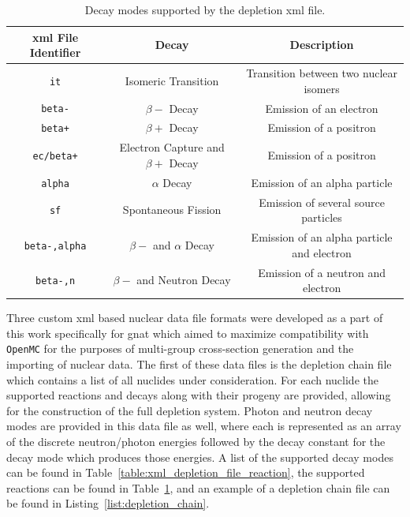 \begin{table}[H]
    \centering
    \caption{Decay modes supported by the depletion \acrshort{xml} file.}
    \begin{tabular}{|c|c|c|}
        \hline
        \acrshort{xml} \textbf{File Identifier} & \textbf{Decay} & \textbf{Description}\\
        \hline
        \texttt{it} & Isomeric Transition & Transition between two nuclear isomers\\
        \texttt{beta-} & $\beta-$ Decay & Emission of an electron\\
        \texttt{beta+} & $\beta+$ Decay & Emission of a positron\\
        \texttt{ec/beta+} & Electron Capture and $\beta+$ Decay & Emission of a positron\\
        \texttt{alpha} & $\alpha$ Decay & Emission of an alpha particle\\
        \texttt{sf} & Spontaneous Fission & Emission of several source particles\\
        \texttt{beta-,alpha} & $\beta -$ and $\alpha$ Decay & Emission of an alpha particle and electron\\
        \texttt{beta-,n} & $\beta -$ and Neutron Decay & Emission of a neutron and electron\\
        \hline
    \end{tabular}
    \label{table:xml_depletion_file_decay}
\end{table}

Three custom \acrfull{xml} based nuclear data file formats were developed as a part of this work specifically for \acrshort{gnat} which aimed to maximize compatibility with \texttt{OpenMC} for the purposes of multi-group cross-section generation and the importing of nuclear data. The first of these data files is the depletion chain file which contains a list of all nuclides under consideration. For each nuclide the supported reactions and decays along with their progeny are provided, allowing for the construction of the full depletion system. Photon and neutron decay modes are provided in this data file as well, where each is represented as an array of the discrete neutron/photon energies followed by the decay constant for the decay mode which produces those energies. A list of the supported decay modes can be found in Table~\ref{table:xml_depletion_file_reaction}, the supported reactions can be found in Table~\ref{table:xml_depletion_file_decay}, and an example of a depletion chain file can be found in Listing~\ref{list:depletion_chain}. 

